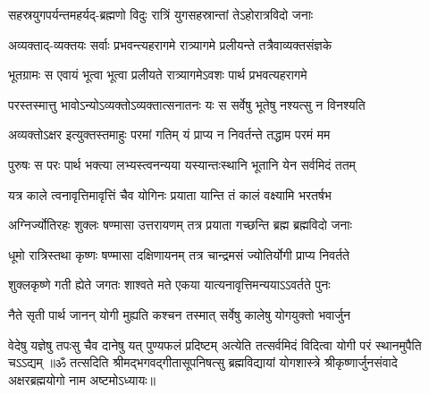 \twolineshloka
{सहस्रयुगपर्यन्तमहर्यद्-ब्रह्मणो विदुः}
{रात्रिं युगसहस्रान्तां तेऽहोरात्रविदो जनाः}%

\twolineshloka
{अव्यक्ताद्-व्यक्तयः सर्वाः प्रभवन्त्यहरागमे}
{रात्र्यागमे प्रलीयन्ते तत्रैवाव्यक्तसंज्ञके}%

\twolineshloka
{भूतग्रामः स एवायं भूत्वा भूत्वा प्रलीयते}
{रात्र्यागमेऽवशः पार्थ प्रभवत्यहरागमे}%

\twolineshloka
{परस्तस्मात्तु भावोऽन्योऽव्यक्तोऽव्यक्तात्सनातनः}
{यः स सर्वेषु भूतेषु नश्यत्सु न विनश्यति}%

\twolineshloka
{अव्यक्तोऽक्षर इत्युक्तस्तमाहुः परमां गतिम्}
{यं प्राप्य न निवर्तन्ते तद्धाम परमं मम}%

\twolineshloka
{पुरुषः स परः पार्थ भक्त्या लभ्यस्त्वनन्यया}
{यस्यान्तःस्थानि भूतानि येन सर्वमिदं ततम्}%

\twolineshloka
{यत्र काले त्वनावृत्तिमावृत्तिं चैव योगिनः}
{प्रयाता यान्ति तं कालं वक्ष्यामि भरतर्षभ}%

\twolineshloka
{अग्निर्ज्योतिरहः शुक्लः षण्मासा उत्तरायणम्}
{तत्र प्रयाता गच्छन्ति ब्रह्म ब्रह्मविदो जनाः}%

\twolineshloka
{धूमो रात्रिस्तथा कृष्णः षण्मासा दक्षिणायनम्}
{तत्र चान्द्रमसं ज्योतिर्योगी प्राप्य निवर्तते}%

\twolineshloka
{शुक्लकृष्णे गती ह्येते जगतः शाश्वते मते}
{एकया यात्यनावृत्तिमन्ययाऽऽवर्तते पुनः}%

\twolineshloka
{नैते सृती पार्थ जानन् योगी मुह्यति कश्चन}
{तस्मात् सर्वेषु कालेषु योगयुक्तो भवार्जुन}%

\fourlineindentedshloka
{वेदेषु यज्ञेषु तपःसु चैव}
{दानेषु यत् पुण्यफलं प्रदिष्टम्}
{अत्येति तत्सर्वमिदं विदित्वा}
{योगी परं स्थानमुपैति चऽऽद्यम्}%
{॥ॐ तत्सदिति श्रीमद्भगवद्गीतासूपनिषत्सु ब्रह्मविद्यायां योगशास्त्रे श्रीकृष्णार्जुनसंवादे अक्षरब्रह्मयोगो नाम अष्टमोऽध्यायः॥}